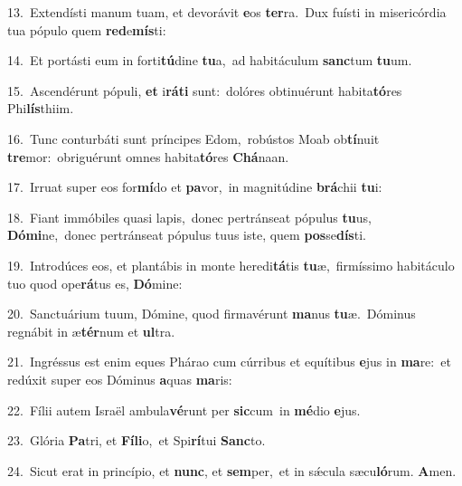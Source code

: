 {\numbfont\textcolor{\numbcolor}{13.}}~Extendísti manum tuam, et devorávit \textbf{e}\-os \textbf{ter}\-ra.~\star Dux fuísti in misericórdia tua pópulo quem \textbf{red}\-e\-\textbf{mís}\-ti:\par
{\numbfont\textcolor{\numbcolor}{14.}}~Et portásti eum in forti\-\textbf{tú}\-dine \textbf{tu}\-a,~\star ad habitáculum \textbf{sanc}\-tum \textbf{tu}\-um.\par
{\numbfont\textcolor{\numbcolor}{15.}}~Ascendérunt pópuli, \textbf{et} i\-\textbf{rá}\-\textbf{ti} sunt:~\star dolóres obtinuérunt habita\-\textbf{tó}\-res Phi\-\textbf{lís}\-thiim.\par
{\numbfont\textcolor{\numbcolor}{16.}}~Tunc conturbáti sunt príncipes Edom,~\dagger robústos Moab ob\-\textbf{tí}\-nuit \textbf{tre}\-mor:~\star obriguérunt omnes habita\-\textbf{tó}\-res \textbf{Chá}\-naan.\par
{\numbfont\textcolor{\numbcolor}{17.}}~Irruat super eos for\-\textbf{mí}\-do et \textbf{pa}\-vor,~\star in magnitúdine \textbf{brá}\-chii \textbf{tu}\-i:\par
{\numbfont\textcolor{\numbcolor}{18.}}~Fiant immóbiles quasi lapis,~\dagger donec pertránseat pópulus \textbf{tu}\-us, \textbf{Dó}\-\textbf{mi}ne,~\star donec pertránseat pópulus tuus iste, quem \textbf{pos}\-se\-\textbf{dís}\-ti.\par
{\numbfont\textcolor{\numbcolor}{19.}}~Introdúces eos, et plantábis in monte heredi\-\textbf{tá}\-tis \textbf{tu}\-æ,~\star firmíssimo habitáculo tuo quod ope\-\textbf{rá}\-tus es, \textbf{Dó}\-mine:\par
{\numbfont\textcolor{\numbcolor}{20.}}~Sanctuárium tuum, Dómine, quod firmavérunt \textbf{ma}\-nus \textbf{tu}\-æ.~\star Dóminus regnábit in æ\-\textbf{tér}\-num et \textbf{ul}\-tra.\par
{\numbfont\textcolor{\numbcolor}{21.}}~Ingréssus est enim eques Phárao cum cúrribus et equítibus \textbf{e}\-jus in \textbf{ma}\-re:~\star et redúxit super eos Dóminus \textbf{a}\-quas \textbf{ma}\-ris:\par
{\numbfont\textcolor{\numbcolor}{22.}}~Fílii autem Israël ambula\-\textbf{vé}\-runt per \textbf{sic}\-cum~\star in \textbf{mé}\-dio \textbf{e}\-jus.\par
{\numbfont\textcolor{\numbcolor}{23.}}~Glória \textbf{Pa}\-tri, et \textbf{Fí}\-\textbf{li}o,~\star et Spi\-\textbf{rí}\-tui \textbf{Sanc}\-to.\par
{\numbfont\textcolor{\numbcolor}{24.}}~Sicut erat in princípio, et \textbf{nunc}\-, et \textbf{sem}\-per,~\star et in sǽcula sæcu\-\textbf{ló}\-rum. \textbf{A}\-men.\par
